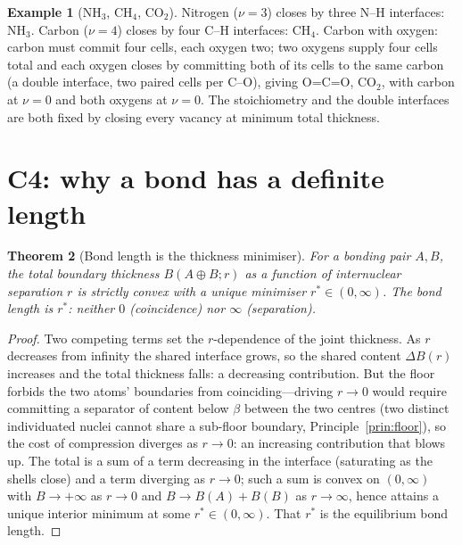 \documentclass[11pt,a4paper]{article}
\theoremstyle{thmstyle}
\newtheorem{theorem}{Theorem}[section]
\theoremstyle{definition}
\newtheorem{example}[theorem]{Example}
\theoremstyle{remark}
\newcommand{\floorc}{\beta}
\newcommand{\thick}{B}                 %
\newcommand{\vac}{\nu}                 %
\begin{document}
\begin{example}[NH$_3$, CH$_4$, CO$_2$]
\label{ex:more}
Nitrogen ($\vac=3$) closes by three N--H interfaces: NH$_3$. Carbon
($\vac=4$) closes by four C--H interfaces: CH$_4$. Carbon with oxygen:
carbon must commit four cells, each oxygen two; two oxygens supply four
cells total and each oxygen closes by committing both of its cells to the
same carbon (a double interface, two paired cells per C--O), giving
O=C=O, CO$_2$, with carbon at $\vac=0$ and both oxygens at $\vac=0$. The
stoichiometry and the double interfaces are both fixed by closing every
vacancy at minimum total thickness.
\end{example}

\section{C4: why a bond has a definite length}
\label{sec:length}

\begin{theorem}[Bond length is the thickness minimiser]
\label{thm:length}
For a bonding pair $A,B$, the total boundary thickness
$\thick(A\!\oplus\!B; r)$ as a function of internuclear separation $r$ is
strictly convex with a unique minimiser $r^{*}\in(0,\infty)$. The bond
length is $r^{*}$: neither $0$ (coincidence) nor $\infty$ (separation).
\end{theorem}

\begin{proof}
Two competing terms set the $r$-dependence of the joint thickness. As
$r$ decreases from infinity the shared interface grows, so the shared
content $\Delta\thick(r)$ increases and the total thickness falls: a
decreasing contribution. But the floor forbids the two atoms' boundaries
from coinciding---driving $r\to0$ would require committing a separator of
content below $\floorc$ between the two centres (two distinct individuated
nuclei cannot share a sub-floor boundary,
Principle~\ref{prin:floor}), so the cost of compression diverges as
$r\to0$: an increasing contribution that blows up. The total is a sum of
a term decreasing in the interface (saturating as the shells close) and a
term diverging as $r\to0$; such a sum is convex on $(0,\infty)$ with
$\thick\to+\infty$ as $r\to0$ and $\thick\to\thick(A)+\thick(B)$ as
$r\to\infty$, hence attains a unique interior minimum at some
$r^{*}\in(0,\infty)$. That $r^{*}$ is the equilibrium bond length.
\end{proof}
\end{document}
